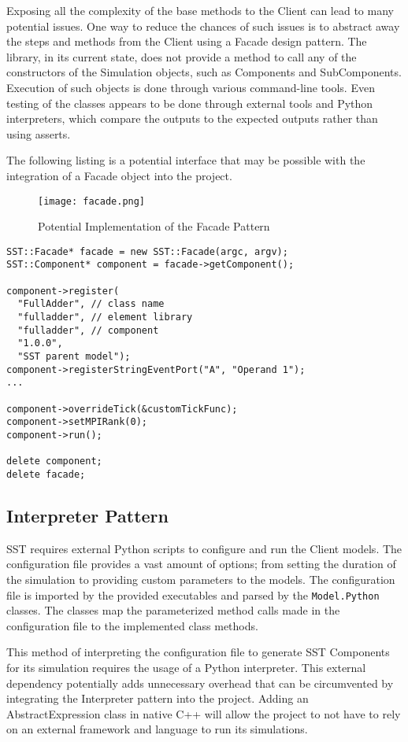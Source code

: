 Exposing all the complexity of the base methods to the Client can lead to many potential issues. One way to reduce the chances of such issues is to abstract away the steps and methods from the Client using a Facade design pattern. The library, in its current state, does not provide a method to call any of the constructors of the Simulation objects, such as Components and SubComponents. Execution of such objects is done through various command-line tools. Even testing of the classes appears to be done through external tools and Python interpreters, which compare the outputs to the expected outputs rather than using asserts.

The following listing is a potential interface that may be possible with the integration of a Facade object into the project.

\begin{figure}[h]
  \caption{Potential Implementation of the Facade Pattern}
  \centering
  \texttt{[image: facade.png]}
\end{figure}
\newpage

\begin{lstlisting}[style=customC++,label=facade,caption=Potential Implementation of Facade]
SST::Facade* facade = new SST::Facade(argc, argv);
SST::Component* component = facade->getComponent();

component->register(
  "FullAdder", // class name
  "fulladder", // element library
  "fulladder", // component
  "1.0.0",
  "SST parent model");
component->registerStringEventPort("A", "Operand 1");
...

component->overrideTick(&customTickFunc);
component->setMPIRank(0);
component->run();

delete component;
delete facade;
\end{lstlisting}

\newpage
\subsection{Interpreter Pattern}
SST requires external Python scripts to configure and run the Client models. The configuration file provides a vast amount of options; from setting the duration of the simulation to providing custom parameters to the models. The configuration file is imported by the provided executables and parsed by the \texttt{Model.Python} classes. The classes map the parameterized method calls made in the configuration file to the implemented class methods.

This method of interpreting the configuration file to generate SST Components for its simulation requires the usage of a Python interpreter. This external dependency potentially adds unnecessary overhead that can be circumvented by integrating the Interpreter pattern into the project. Adding an AbstractExpression class in native C++ will allow the project to not have to rely on an external framework and language to run its simulations.

